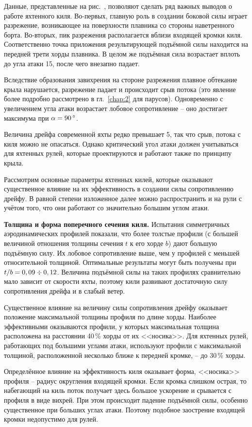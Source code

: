 Данные, представленные на рис.~, позволяют сделать ряд важных
выводов о работе яхтенного киля. Во-первых, главную роль в создании
боковой силы играет разрежение, возникающее на поверхности плавника со
стороны наветренного борта. Во-вторых, пик разрежения располагается
вблизи входящей кромки киля. Соответственно точка приложения
результирующей подъёмной силы находится на передней трети хорды
плавника. В целом же подъёмная сила возрастает вплоть до угла атаки
15\gr, после чего внезапно падает.

Вследствие образования завихрения на стороне разрежения плавное
обтекание крыла нарушается, разрежение падает и происходит срыв потока
(это явление более подробно рассмотрено в гл.~\ref{chap:2} для
парусов). Одновременно с увеличением угла атаки возрастает лобовое
сопротивление \--- оно достигает максимума при $\alpha = 90\,^\circ$.

Величина дрейфа современной яхты редко превышает 5\gr, так что срыв,
потока с киля можно не опасаться. Однако критический угол атаки должен
учитываться для яхтенных рулей, которые проектируются и работают также
по принципу крыла.

Рассмотрим основные параметры яхтенных килей, которые оказывают
существенное влияние на их эффективность в создании силы сопротивлению
дрейфу. В равной степени изложенное далее можно распространить и на
рули с учётом того, что они работают со значительно большим углом
атаки.

\textbf{Толщина и форма поперечного сечения киля.} Испытания
симметричных аэродинамических профилей показали, что более толстые
профили (с большей величиной отношения толщины сечения $t$ к его хорде
$b$) дают большую подъёмную силу. Их лобовое сопротивление выше, чем у
профилей с меньшей относительной толщиной. Оптимальные результаты
могут быть получены при $t/b = 0,09 \div 0,12$. Величина подъёмной
силы на таких профилях сравнительно мало зависит от скорости яхты,
поэтому кили развивают достаточную силу сопротивления дрейфа и в
слабый ветер.

Существенное влияние на величину силы сопротивления дрейфу оказывает
положение максимальной толщины профиля по длине хорды. Наиболее
эффективными оказываются профили, у которых максимальная толщина
расположена на расстоянии 40\,\% хорды от их <<носика>>. Для
яхтенных рулей, работающих под большими углами атаки, используют
профили с максимальной толщиной, расположенной несколько ближе к
передней кромке, \--- до 30\,\% хорды.

Определённое влияние на эффективность киля оказывает форма, <<носика>>
профиля \--- радиус округления входящей кромки. Если кромка слишком
острая, то набегающий на киль поток получает здесь большое ускорение и
срывается с профиля в виде вихрей. При этом происходит падение
подъёмной силы, особенно существенное при больших углах атаки. Поэтому
подобное заострение входящей кромки недопустимо для рулей.

